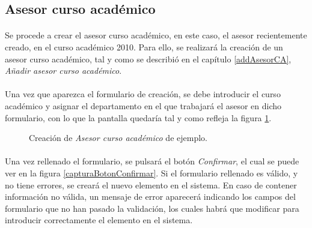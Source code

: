 \subsection{Asesor curso académico}

  \paragraph{}Se procede a crear el asesor curso académico, en este caso, el
  asesor recientemente creado, en el curso académico 2010. Para ello, se
  realizará la creación de un asesor curso académico, tal y como se describió en
  el capítulo \ref{addAsesorCA}, \textit{Añadir asesor curso académico}.

  \paragraph{}Una vez que aparezca el formulario de creación, se debe introducir
  el curso académico y asignar el departamento en el que trabajará el asesor en
  dicho formulario, con lo que la pantalla quedaría tal y como refleja la figura
  \ref{ejemploAddAsesorCA}.

  \begin{figure}[!ht]
    \begin{center}
      \caption{Creación de \textit{Asesor curso académico} de ejemplo.}
      \label{ejemploAddAsesorCA}
    \end{center}
  \end{figure}

  \paragraph{}Una vez rellenado el formulario, se pulsará el botón
  \textit{Confirmar}, el cual se puede ver en la figura
  \ref{capturaBotonConfirmar}. Si el formulario rellenado es válido, y no tiene
  errores, se creará el nuevo elemento en el sistema. En caso de contener
  información no válida, un mensaje de error aparecerá indicando los campos
  del formulario que no han pasado la validación, los cuales habrá que modificar
  para introducir correctamente el elemento en el sistema.

